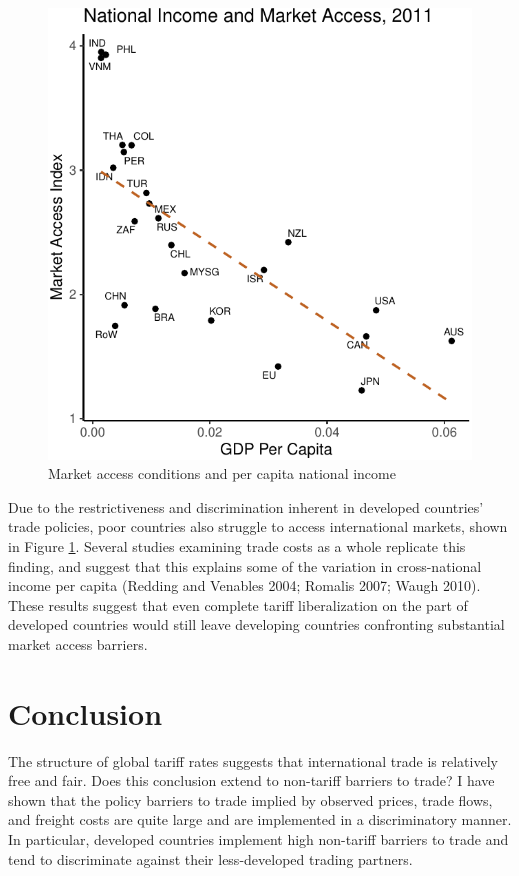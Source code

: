 \documentclass{puthesis}
\begin{document}
\begin{figure}
\centering
\includegraphics{figure/maiGdppc-1.pdf}
\caption{Market access conditions and per capita national income
\label{fig:maiGdppc}}
\end{figure}

Due to the restrictiveness and discrimination inherent in developed
countries' trade policies, poor countries also struggle to access
international markets, shown in Figure \ref{fig:maiGdppc}. Several
studies examining trade costs as a whole replicate this finding, and
suggest that this explains some of the variation in cross-national
income per capita (Redding and Venables 2004; Romalis 2007; Waugh 2010).
These results suggest that even complete tariff liberalization on the
part of developed countries would still leave developing countries
confronting substantial market access barriers.

\section{Conclusion}

The structure of global tariff rates suggests that international trade
is relatively free and fair. Does this conclusion extend to non-tariff
barriers to trade? I have shown that the policy barriers to trade
implied by observed prices, trade flows, and freight costs are quite
large and are implemented in a discriminatory manner. In particular,
developed countries implement high non-tariff barriers to trade and tend
to discriminate against their less-developed trading partners.
\end{document}
